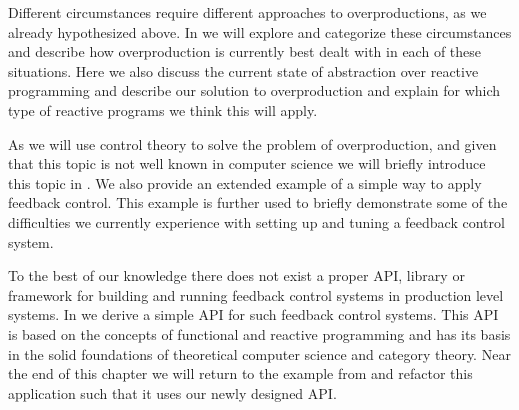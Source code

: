 Different circumstances require different approaches to overproductions, as we already hypothesized above. In  we will explore and categorize these circumstances and describe how overproduction is currently best dealt with in each of these situations. Here we also discuss the current state of abstraction over reactive programming and describe our solution to overproduction and explain for which type of reactive programs we think this will apply.

As we will use control theory to solve the problem of overproduction, and given that this topic is not well known in computer science we will briefly introduce this topic in . We also provide an extended example of a simple way to apply feedback control. This example is further used to briefly demonstrate some of the difficulties we currently experience with setting up and tuning a feedback control system.

To the best of our knowledge there does not exist a proper API, library or framework for building and running feedback control systems in production level systems. In  we derive a simple API for such feedback control systems. This API is based on the concepts of functional and reactive programming and has its basis in the solid foundations of theoretical computer science and category theory. Near the end of this chapter we will return to the example from  and refactor this application such that it uses our newly designed API.

